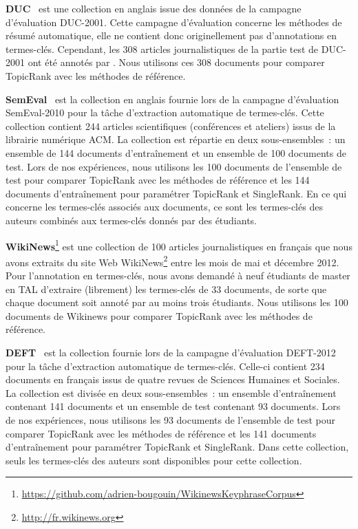       \textbf{DUC}~\cite{over2001duc} est une collection en anglais issue des
      données de la campagne d'évaluation DUC-2001. Cette campagne d'évaluation
      concerne les méthodes de résumé automatique, elle ne contient donc
      originellement pas d'annotations en termes-clés. Cependant, les 308
      articles journalistiques de la partie test de DUC-2001 ont été annotés par
      . Nous utilisons ces 308 documents pour
      comparer TopicRank avec les méthodes de référence.

      \textbf{SemEval}~\cite{kim2010semeval} est la collection en anglais
      fournie lors de la campagne d'évaluation SemEval-2010 pour la tâche
      d'extraction automatique de termes-clés. Cette collection contient 244
      articles scientifiques (conférences et ateliers) issus de la librairie
      numérique ACM. La collection est répartie en deux sous-ensembles~: un
      ensemble de 144 documents d'entraînement et un ensemble de 100 documents
      de test. Lors de nos expériences, nous utilisons les 100 documents de
      l'ensemble de test pour comparer TopicRank avec les méthodes de
      référence et les 144 documents d'entraînement pour paramétrer TopicRank et
      SingleRank. En ce qui concerne les termes-clés associés aux documents, ce
      sont les termes-clés des auteurs combinés aux termes-clés donnés par des
      étudiants.

      \textbf{WikiNews}\footnote{\url{https://github.com/adrien-bougouin/WikinewsKeyphraseCorpus}}
      est une collection de 100 articles journalistiques en français que nous
      avons extraits du site Web
      WikiNews\footnote{\url{http://fr.wikinews.org}} entre les mois de mai et
      décembre 2012. Pour l'annotation en termes-clés, nous avons demandé à neuf
      étudiants de master en TAL d'extraire (librement) les termes-clés de 33
      documents, de sorte que chaque document soit annoté par au moins trois
      étudiants. Nous utilisons les 100 documents de Wikinews pour comparer
      TopicRank avec les méthodes de référence.

      \textbf{DEFT}~\cite{paroubek2012deft} est la collection fournie lors de la
      campagne d'évaluation DEFT-2012 pour la tâche d'extraction automatique de
      termes-clés. Celle-ci contient 234 documents en français issus de quatre
      revues de Sciences Humaines et Sociales. La collection est divisée en deux
      sous-ensembles~: un ensemble d'entraînement contenant 141 documents et un
      ensemble de test contenant 93 documents. Lors de nos expériences, nous
      utilisons les 93 documents de l'ensemble de test pour comparer TopicRank
      avec les méthodes de référence et les 141 documents d'entraînement pour
      paramétrer TopicRank et SingleRank. Dans cette collection, seuls les
      termes-clés des auteurs sont disponibles pour cette collection.

